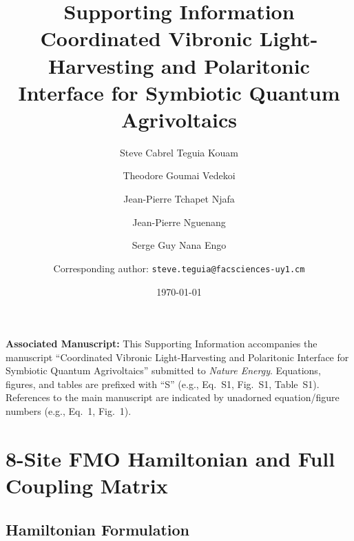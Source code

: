 \documentclass[11pt,a4paper]{article}
\begin{document}
\title{\textbf{Supporting Information}\\[0.5em]
\large Coordinated Vibronic Light-Harvesting and Polaritonic Interface for Symbiotic Quantum Agrivoltaics}

\author{Steve Cabrel Teguia Kouam}
\author{Theodore Goumai Vedekoi}
\author{Jean-Pierre Tchapet Njafa}
\author{Jean-Pierre Nguenang}
\author{Serge Guy Nana Engo}
\author{Corresponding author: \texttt{steve.teguia@facsciences-uy1.cm}}

\date{\today}

\maketitle

\noindent\textbf{Associated Manuscript:}
This Supporting Information accompanies the manuscript ``Coordinated Vibronic Light-Harvesting and Polaritonic Interface for Symbiotic Quantum Agrivoltaics'' submitted to \textit{Nature Energy}.
Equations, figures, and tables are prefixed with ``S'' (e.g., Eq.~S1, Fig.~S1, Table~S1).
References to the main manuscript are indicated by unadorned equation/figure numbers (e.g., Eq.~1, Fig.~1).

\vspace{1em}

\tableofcontents

\newpage


\section{8-Site FMO Hamiltonian and Full Coupling Matrix}
\label{SI-sec:hamiltonian}

\subsection{Hamiltonian Formulation}
\end{document}
